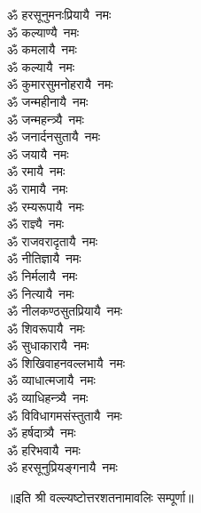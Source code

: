 \begin{flushleft}
\begin{multicols}{2}
ॐ हरसूनुमनःप्रियायै~नमः\\
ॐ कल्याण्यै~नमः\\
ॐ कमलायै~नमः\\
ॐ कल्यायै~नमः\\
ॐ कुमारसुमनोहरायै~नमः\\
ॐ जन्महीनायै~नमः\\
ॐ जन्महन्त्र्यै~नमः\\
ॐ जनार्दनसुतायै~नमः\\
ॐ जयायै~नमः\hfill{}\\
ॐ रमायै~नमः\\
ॐ रामायै~नमः\\
ॐ रम्यरूपायै~नमः\\
ॐ राज्ञ्यै~नमः\\
ॐ राजवरादृतायै~नमः\\
ॐ नीतिज्ञायै~नमः\\
ॐ निर्मलायै~नमः\\
ॐ नित्यायै~नमः\\
ॐ नीलकण्ठसुतप्रियायै~नमः\\
ॐ शिवरूपायै~नमः\hfill{}\\
ॐ सुधाकारायै~नमः\\
ॐ शिखिवाहनवल्लभायै~नमः\\
ॐ व्याधात्मजायै~नमः\\
ॐ व्याधिहन्त्र्यै~नमः\\
ॐ विविधागमसंस्तुतायै~नमः\\
ॐ हर्षदात्र्यै~नमः\\
ॐ हरिभवायै~नमः\\
ॐ हरसूनुप्रियङ्गनायै~नमः\\
\end{multicols}
\end{flushleft}
॥इति श्री वल्ल्यष्टोत्तरशतनामावलिः सम्पूर्णा॥
